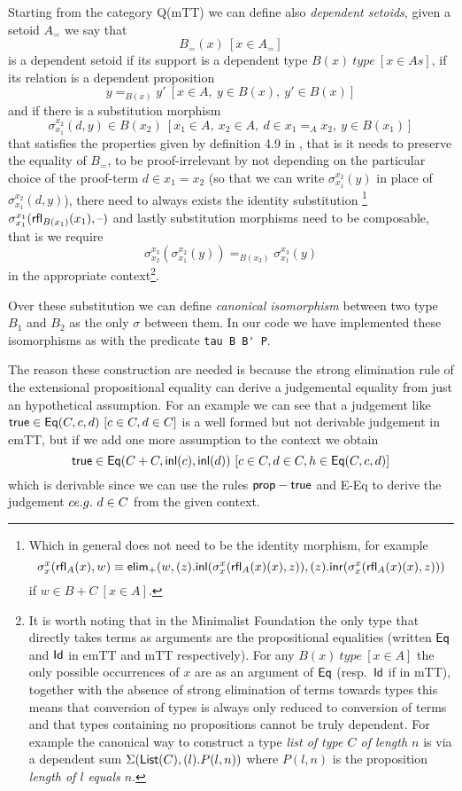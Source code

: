 	Starting from the category Q(mTT) we can define also \emph{dependent setoids}, given a setoid $A_=$ we say that \[B_=(x)\ [x\in A_=] \]	 is a dependent setoid if its support is a dependent type \(B(x)\ type\ [x \in As]\), if its relation is a dependent proposition \[ y =_{B(x)} y'\ [x \in A,\ y \in B(x),\ y' \in B(x)]\] and if there is a substitution morphism \[\sigma^{x_2}_{x_1}(d,y)\in{}B(x_2)\ [x_1 \in A,\ x_2 \in A,\ d \in x_1 =_A x_2 ,\ y \in B(x_1)]\] that satisfies the properties given by definition 4.9 in \cite{maietti2009minimalist}, that is it needs to preserve the equality of $B_=$, to be proof-irrelevant by not depending on the particular choice of the proof-term $d\in x_1=x_2$ (so that we can write $\sigma^{x_2}_{x_1}(y)$ in place of $\sigma^{x_2}_{x_1}(d,y)$), there need to always exists the identity substitution
		\footnote{Which in general does not need to be the identity morphism, for example 
			\[\sigma^{x}_{x}({\text{\ensuremath{\mathsf{rfl}}}}_A(x),w) \equiv
			 {\text{\ensuremath{\mathsf{elim}}}}_+(
			 	w
			 	,(z).{\text{\ensuremath{\mathsf{inl}}}}(\sigma^{x}_{x}({\text{\ensuremath{\mathsf{rfl}}}}_A(x)(x),z))
			 	,(z).{\text{\ensuremath{\mathsf{inr}}}}(\sigma^{x}_{x}({\text{\ensuremath{\mathsf{rfl}}}}_A(x)(x),z))
			 )
			\] if $w \in  B+C\ [x\in A]$.
		}
	$\sigma^{x_1}_{x_1}({\text{\ensuremath{\mathsf{rfl}}}}_{B(x_1)}(x_1), \text\textendash)$ and lastly substitution morphisms need to be composable, that is we require \[\sigma^{x_3}_{x_2}(\sigma^{x_2}_{x_1}(y)) =_{B(x_3)} \sigma^{x_3}_{x_1}(y)\] in the appropriate context\footnote{It is worth noting that in the Minimalist Foundation the only type that directly takes terms as arguments are the propositional equalities (written ${\text{\ensuremath{\mathsf{Eq}}}}$ and ${\text{\ensuremath{\mathsf{Id}}}}$ in emTT and mTT respectively). For any $B(x)\ type\ [x\in A]$ the only possible occurrences of $x$ are as an argument of ${\text{\ensuremath{\mathsf{Eq}}}}$ (resp.\ ${\text{\ensuremath{\mathsf{Id}}}}$ if in mTT), together with the absence of strong elimination of terms towards types this means that conversion of types is always only reduced to conversion of terms and that types containing no propositions cannot be truly dependent. For example the canonical way to construct a type \emph{list of type $C$ of length $n$} is via a dependent sum $\Sigma({\text{\ensuremath{\mathsf{List}}}}(C),(l).P(l,n))$ where $P(l,n)$ is the proposition \emph{length of $l$ equals $n$}.}.
	
	Over these substitution we can define \emph{canonical isomorphism} between two type $B_1$ and $B_2$ as the only $\sigma$ between them. In our code we have implemented these isomorphisms as with the predicate \verb|tau B B' P|.

	The reason these construction are needed is because the strong elimination rule of the extensional propositional equality can derive a judgemental equality from just an hypothetical assumption. For an example we can see that a judgement like ${\text{\ensuremath{\mathsf{true}}}} \in {\text{\ensuremath{\mathsf{Eq}}}}(C,c,d)\ [c \in C, d\in C]$ is a well formed but not derivable judgement in emTT, but if we add one more assumption to the context we obtain \[\s{true} \in \s{Eq}(C+C,\s{inl}(c),\s{inl}(d))\ [c \in C, d\in C, h\in \s{Eq}(C,c,d)]\] which is derivable since we can use the rules ${\text{\ensuremath{\mathsf{prop-true}}}}$ and {E-Eq} to derive the judgement $ce.g.{\ } d\in C$ from the given context.
	
